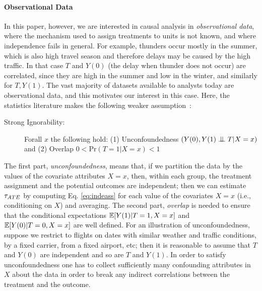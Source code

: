 \paragraph*{\bf{Observational Data}}
In this paper, however, we are interested in causal analysis in {\em
  observational data}, where the mechanism used to assign treatments
to units is not known, and where independence fails in general.  For
example, thunders occur mostly in the summer, which is also high
travel season and therefore delays may be caused by the high traffic.
In that case $T$ and $Y(0)$ (the delay when thunder does not occur)
are correlated, since they are high in the summer and low in the
winter, and similarly for $T,Y(1)$.  The vast majority of datasets
available to analysts today are observational data, and this motivates
our interest in this case.  Here, the statistics literature makes the
following weaker assumption~\cite{Rubin1983b}:

\begin{description}
\item[Strong Ignorability:] Forall $x$ the following hold: \newline
  (1) Unconfoundedness $({Y(0), Y(1) \bigCI T} | X=x)$ and \newline
  (2) Overlap $0 < \textrm{Pr}(T = 1 | X=x) < 1$
\end{description}

The first part, {\em unconfoundedness}, means that, if we partition
the data by the values of the covariate attributes $X=x$, then, within
each group, the treatment assignment and the potential outcomes are independent; then we can
estimate ${\tau_{ATE}}$ by computing Eq. \ref{eq:indeass} for each value of
the covariates $X=x$ (i.e., conditioning on $X$) and averaging.  The
second part, {\em overlap} is needed to ensure that the conditional
expectations $\mathbb{E}[Y(1)|T=1,X=x]$ and $\mathbb{E}[Y(0)|T=0,X=x]$ are well
defined.  For an illustration of unconfoundedness, suppose we restrict
to flights on dates with similar weather and traffic conditions, by a
fixed carrier, from a fixed airport, etc; then it is reasonable to
assume that $T$ and $Y(0)$ are independent and so are $T$ and $Y(1)$.
In order to satisfy unconfoundedness one has to collect sufficiently
many confounding attributes in $X$ about the data in order to break
any indirect correlations between the treatment and the outcome.


